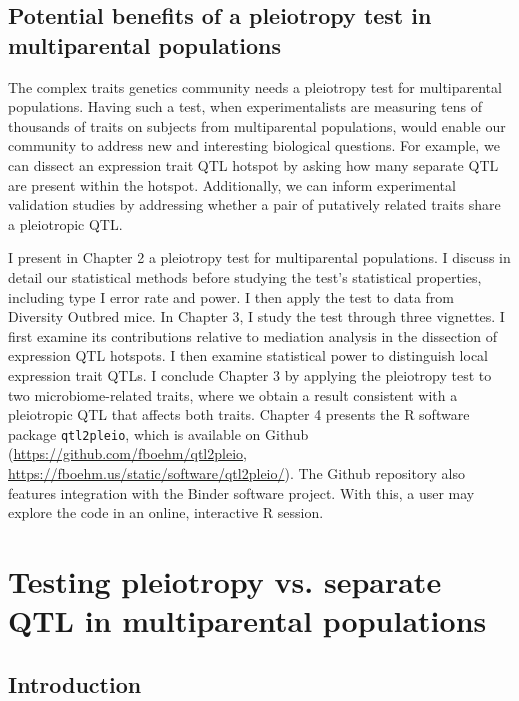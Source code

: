 \documentclass[oneside]{book}\usepackage[]{graphicx}\usepackage[]{color}
\begin{document}
\section{Potential benefits of a pleiotropy test in multiparental populations}\label{sec:pleiotropy-mpp}

The complex traits genetics community needs a pleiotropy test for
multiparental populations. Having such a test, when experimentalists are
measuring tens of thousands of traits on subjects from multiparental populations,
would enable our community to address new and interesting biological questions.
For example, we can dissect an expression trait QTL hotspot by asking how many
separate QTL are present within the hotspot. Additionally, we can inform experimental
validation studies by addressing whether a pair of putatively related traits share a
pleiotropic QTL.

I present in Chapter 2 a pleiotropy test for multiparental populations. I discuss in 
detail our statistical methods before studying the test's statistical properties,
including type I error rate and power. I then apply the test to data from Diversity
Outbred mice. In Chapter 3, I study the test through three vignettes. I first examine
its contributions relative to mediation analysis in the dissection of expression QTL
hotspots. I then examine statistical power to distinguish local expression trait QTLs.
I conclude Chapter 3 by applying the pleiotropy test to two microbiome-related traits,
where we obtain a result consistent with a pleiotropic QTL that affects both traits.
Chapter 4 presents the R software package \texttt{qtl2pleio}, which is
available on Github (\url{https://github.com/fboehm/qtl2pleio}, 
\url{https://fboehm.us/static/software/qtl2pleio/}). The Github repository also
features integration with the Binder software project. With this, a user may explore the
code in an online, interactive R session. 











\chapter{Testing pleiotropy vs. separate QTL in multiparental populations}


\section{Introduction}
\end{document}
